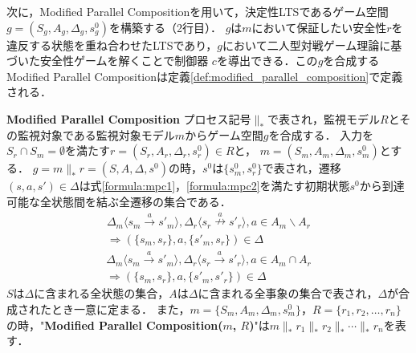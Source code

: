 次に，Modified Parallel Compositionを用いて，決定性LTSであるゲーム空間 $g = (S_{g}, A_{g}, \Delta_{g}, s^0_{g})$を構築する（2行目）．
$g$は$m$において保証したい安全性$r$を違反する状態を重ね合わせたLTSであり，$g$において二人型対戦ゲーム理論に基づいた安全性ゲームを解くことで制御器 $c$を導出できる．この$g$を合成するModified Parallel Compositionは定義\ref{def:modified_parallel_composition}で定義される．
\begin{dfn}{\textbf{Modified Parallel Composition}}
\label{def:modified_parallel_composition}
    プロセス記号$\parallel_*$で表され，監視モデル$R$とその監視対象である監視対象モデル$m$からゲーム空間$g$を合成する．
    入力を$S_{r} \cap S_{m} = \emptyset$を満たす$r = (S_{r}, A_{r}, \Delta_{r}, s^0_{r}) \in R$と，
    $m = (S_{m}, A_{m}, \Delta_{m}, s^0_{m})$とする．
    $g = m \parallel_* r = (S, A, \Delta, s^0)$の時，$s^0$は$\{ s^0_{m}, s^0_{r} \}$で表され，遷移$(s,a,s')\in\Delta$は式\ref{formula:mpc1}，\ref{formula:mpc2}を満たす初期状態$s^0$から到達可能な全状態間を結ぶ全遷移の集合である．
    \begin{multline}
    \label{formula:mpc1}
    \Delta_m \langle s_{m} \overset{a}{\rightarrow} s'_{m} \rangle, \Delta_r \langle s_{r} \overset{a}{\nrightarrow} s'_{r} \rangle, a \in A_{m} \backslash A_{r}\\
    \Rightarrow (\{ s_{m},s_{r} \},a,\{ s'_{m},s_{r} \} ) \in \Delta
    \end{multline}
    \begin{multline}
    \label{formula:mpc2}
    \Delta_m \langle s_{m} \overset{a}{\rightarrow} s'_{m} \rangle, \Delta_r \langle s_{r} \overset{a}{\rightarrow} s'_{r} \rangle, a \in A_{m} \cap A_{r}\\
    \Rightarrow (\{ s_{m},s_{r} \},a,\{ s'_{m},s'_{r} \}) \in \Delta
    \end{multline}
    $S$は$\Delta$に含まれる全状態の集合，$A$は$\Delta$に含まれる全事象の集合で表され，$\Delta$が合成されたとき一意に定まる．
    また，$m = \{S_{m}, A_{m}, \Delta_{m}, s^0_{m}\}$，$R = \{r_1, r_2, \ldots, r_n\}$の時，"{\bf Modified Parallel Composition($m$, $R$)}"は$m \parallel_* r_1 \parallel_* r_2 \parallel_* \cdots \parallel_* r_n$を表す．
\end{dfn}

